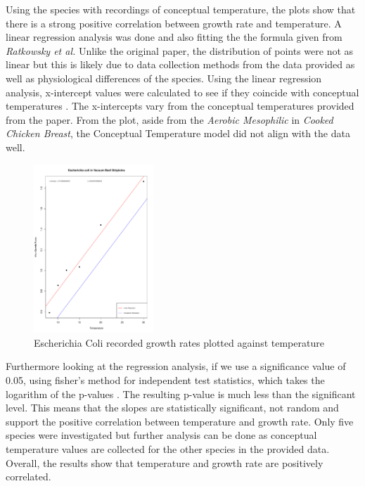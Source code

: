 \documentclass[11pt]{article}
\begin{document}
Using the species with recordings of conceptual temperature, the plots show that there is a strong positive correlation between growth rate and temperature. A linear regression analysis was done and also fitting the the formula given from \textit{Ratkowsky et al.} Unlike the original paper, the distribution of points were not as linear but this is likely due to data collection methods from the data provided as well as physiological differences of the species. Using the linear regression analysis, x-intercept values were calculated to see if they coincide with conceptual temperatures \cite{ratkowsky1982relationship}. The x-intercepts vary from the conceptual temperatures provided from the paper. From the plot, aside from the \textit{Aerobic Mesophilic} in \textit{Cooked Chicken Breast}, the Conceptual Temperature model did not align with the data well.

\begin{figure}
    \begin{center}
        \includegraphics[width=0.40\textwidth]{../Results/Ecoli_r_temp.pdf}
    \end{center}
    \caption{Escherichia Coli recorded growth rates plotted against temperature}
    \label{fig:E.coli correlation}
\end{figure}

Furthermore looking at the regression analysis, if we use a significance value of 0.05, using fisher’s method for independent test statistics, which takes the logarithm of the p-values \cite[p.103]{fisher1992statistical}. The resulting p-value is much less than the significant level. This means that the slopes are statistically significant, not random and support the positive correlation between temperature and growth rate. Only five species were investigated but further analysis can be done as conceptual temperature values are collected for the other species in the provided data. Overall, the results show that temperature and growth rate are positively correlated.\\
\end{document}
